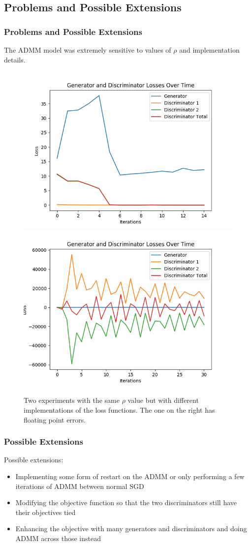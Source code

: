 \documentclass{beamer}
\begin{document}

\subsection{Problems and Possible Extensions}

\begin{frame}
\frametitle{Problems and Possible Extensions}
  The ADMM model was extremely sensitive to values of $\rho$ and implementation details.

  \begin{figure}
    \includegraphics[width=0.4\linewidth]{./images/rho_loss_slow.png}
    \includegraphics[width=0.4\linewidth]{./images/rho_loss_fast.png}
    \caption{Two experiments with the same $\rho$ value but with different implementations of the loss functions. The one on the right has floating point errors.}
  \end{figure}
\end{frame}


\begin{frame}
\frametitle{Possible Extensions}
  Possible extensions:
  \begin{itemize}
    \item Implementing some form of restart on the ADMM or only performing a few iterations of ADMM between normal SGD
    \item Modifying the objective function so that the two discriminators still have their objectives tied
    \item Enhancing the objective with many generators and discriminators and doing ADMM across those instead
  \end{itemize}
\end{frame}


\end{document}
